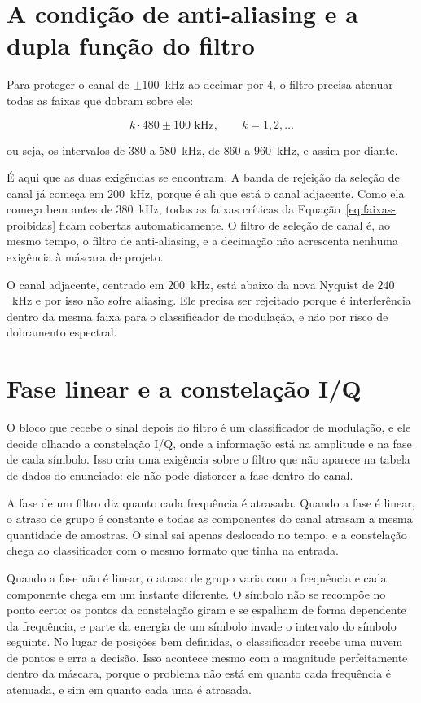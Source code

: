 \newpage
\section{A condição de anti-aliasing e a dupla função do filtro}

Para proteger o canal de $\pm 100$~kHz ao decimar por $4$, o filtro precisa atenuar todas as faixas que dobram sobre ele:

\begin{equation}
k \cdot 480 \pm 100 \text{ kHz}, \qquad k = 1, 2, \dots
\label{eq:faixas-proibidas}
\end{equation}

ou seja, os intervalos de $380$ a $580$~kHz, de $860$ a $960$~kHz, e assim por diante.

É aqui que as duas exigências se encontram. A banda de rejeição da seleção de canal já começa em $200$~kHz, porque é ali que está o canal adjacente. Como ela começa bem antes de $380$~kHz, todas as faixas críticas da Equação~\eqref{eq:faixas-proibidas} ficam cobertas automaticamente. O filtro de seleção de canal é, ao mesmo tempo, o filtro de anti-aliasing, e a decimação não acrescenta nenhuma exigência à máscara de projeto.

O canal adjacente, centrado em $200$~kHz, está abaixo da nova Nyquist de $240$~kHz e por isso não sofre aliasing. Ele precisa ser rejeitado porque é interferência dentro da mesma faixa para o classificador de modulação, e não por risco de dobramento espectral.

\section{Fase linear e a constelação I/Q}

O bloco que recebe o sinal depois do filtro é um classificador de modulação, e ele decide olhando a constelação I/Q, onde a informação está na amplitude e na fase de cada símbolo. Isso cria uma exigência sobre o filtro que não aparece na tabela de dados do enunciado: ele não pode distorcer a fase dentro do canal.

A fase de um filtro diz quanto cada frequência é atrasada. Quando a fase é linear, o atraso de grupo é constante e todas as componentes do canal atrasam a mesma quantidade de amostras. O sinal sai apenas deslocado no tempo, e a constelação chega ao classificador com o mesmo formato que tinha na entrada.

Quando a fase não é linear, o atraso de grupo varia com a frequência e cada componente chega em um instante diferente. O símbolo não se recompõe no ponto certo: os pontos da constelação giram e se espalham de forma dependente da frequência, e parte da energia de um símbolo invade o intervalo do símbolo seguinte. No lugar de posições bem definidas, o classificador recebe uma nuvem de pontos e erra a decisão. Isso acontece mesmo com a magnitude perfeitamente dentro da máscara, porque o problema não está em quanto cada frequência é atenuada, e sim em quanto cada uma é atrasada.

